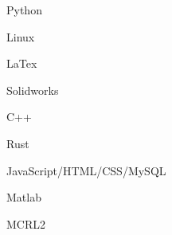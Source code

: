 \begin{cSection}{\textwidth}{0.5\textwidth}{0.48\textwidth}
{%
\begin{cSubsection}{}
  \begin{experienceItem} {}{Python}{}{} \end{experienceItem}
  \begin{experienceItem} {\hphantom{}}{Linux}{}{} \end{experienceItem}
  \begin{experienceItem} {\hphantom{}}{LaTex}{}{} \end{experienceItem}
  \begin{experienceItem} {\hphantom{}}{Solidworks}{}{} \end{experienceItem}

  \begin{experienceItem} {}{C++}{}{} \end{experienceItem}
  \begin{experienceItem} {\hphantom{}}{Rust}{}{} \end{experienceItem}
  \begin{experienceItem} {\hphantom{}}{JavaScript/HTML/CSS/MySQL}{}{} \end{experienceItem}
  \begin{experienceItem} {\hphantom{}}{Matlab}{}{} \end{experienceItem}
  \begin{experienceItem} {\hphantom{}}{MCRL2}{}{} \end{experienceItem}
\end{cSubsection}

}
\end{cSection}
